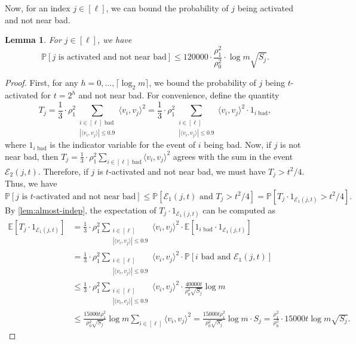 \documentclass[reqno]{amsart}
\newtheorem{lemma}[theorem]{Lemma}
\theoremstyle{remark}
\theoremstyle{definition}
\numberwithin{theorem}{section}
\renewcommand{\(}{\bigl(}
\renewcommand{\)}{\bigr)\vphantom{)}}
\newcommand{\cE}{\mathcal E}
\newcommand{\E}{\mathbb{E}}
\renewcommand{\le}{\leqslant}
\renewcommand{\P}{\mathbb{P}}
\newcommand{\ceil}[1]{\lceil#1\rceil}
\newcommand{\ang}[1]{\langle#1\rangle}
\begin{document}
Now, for an index $j\in [\ell]$, we can bound the probability of $j$ being activated and not near bad.


\begin{lemma}\label{lem:activated-not-near-bad}
    For $j\in [\ell]$, we have
    \[\P[j\text{ is activated and not near bad}]\le 120000\cdot \frac{\rho_1^2}{\rho_0^2}\cdot\log m\sqrt{S_j}.\]
\end{lemma}

\begin{proof}
     First, for any $h = 0,\dots, \ceil{\log_2 m}$, we bound the probability of $j$ being $t$-activated for $t=2^h$ and not near bad. For convenience, define the quantity
    \[T_j =\frac{1}{3} \cdot \rho_1^2 \sum_{\substack{i\in [\ell] \text{ bad}\\ |\ang{v_i, v_j}|\le 0.9}}\ang{v_i,v_j}^2 = \frac{1}{3} \cdot\rho_1^2\sum_{\substack{i\in [\ell]\\ |\ang{v_i, v_j}|\le 0.9}}\ang{v_i,v_j}^2\cdot 1_{i\text{ bad}},\]
    where $1_{i\text{ bad}}$ is the indicator variable for the event of $i$ being bad. Now, if $j$ is not near bad, then $T_j = \frac{1}{3} \cdot\rho_1^2\sum_{i\in [\ell]\text{ bad}}\ang{v_i,v_j}^2$ agrees with the sum in the event $\cE_2(j,t)$. Therefore, if $j$ is $t$-activated and not near bad, we must have $T_j > t^2/4$. Thus, we have
    \[\P[j\text{ is $t$-activated and not near bad}] \le \P[\cE_1(j,t)\text{ and }T_j > t^2/4] = \P[T_j\cdot 1_{\cE_1(j,t)} > t^2/4].\]
    By \cref{lem:almost-indep}, the expectation of $T_j\cdot 1_{\cE_1(j,t)}$ can be computed as
    \begin{align*}
        \E[T_j\cdot 1_{\cE_1(j,t)}] &=\frac{1}{3} \cdot\rho_1^2 \sum_{\substack{i\in [\ell]\\|\ang{v_i,v_j}|\le 0.9}}\ang{v_i,v_j}^2\cdot\E[1_{i\text{ bad}}\cdot 1_{\cE_1(j,t)}]\\
        &=\frac{1}{3} \cdot\rho_1^2 \sum_{\substack{i\in [\ell]\\|\ang{v_i,v_j}|\le 0.9}}\ang{v_i,v_j}^2\cdot \P[i\text{ bad}\text{ and }\cE_1(j,t)]\\
        &\le \frac{1}{3} \cdot\rho_1^2 \sum_{\substack{i\in [\ell]\\|\ang{v_i,v_j}|\le 0.9}}\ang{v_i, v_j}^2\cdot \frac{40000t}{\rho_0^2\sqrt{S_j}}\log m\\
        &\le \frac{15000t\rho_1^2}{\rho_0^2\sqrt{S_j}}\log m \sum_{i\in [\ell]}\ang{v_i, v_j}^2= \frac{15000t\rho_1^2}{\rho_0^2\sqrt{S_j}}\log m\cdot S_j
        = \frac{\rho_1^2 }{\rho_0^2}\cdot 15000t\log m\sqrt{S_j}.
    \end{align*}

\end{proof}
\end{document}
